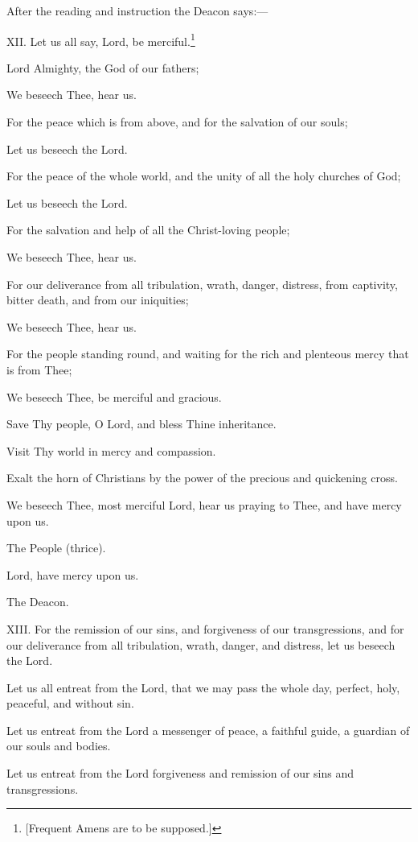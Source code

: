 After the reading and instruction the Deacon says:—

XII. Let us all say, Lord, be merciful.\footnote{\par{}  [Frequent Amens are to be supposed.]}

Lord Almighty, the God of our fathers;

We beseech Thee, hear us.

For the peace which is from above, and for the salvation of our souls;

Let us beseech the Lord.

For the peace of the whole world, and the unity of all the holy churches of God;

Let us beseech the Lord.

For the salvation and help of all the Christ-loving people;

We beseech Thee, hear us.

For our deliverance from all tribulation, wrath, danger, distress, from captivity, bitter death, and from our iniquities;

We beseech Thee, hear us.

For the people standing round, and waiting for the rich and plenteous mercy that is from Thee;

We beseech Thee, be merciful and gracious.

Save Thy people, O Lord, and bless Thine inheritance.

Visit Thy world in mercy and compassion.

Exalt the horn of Christians by the power of the precious and quickening cross.

We beseech Thee, most merciful Lord, hear us praying to Thee, and have mercy upon us.

The People (thrice).

Lord, have mercy upon us.

The Deacon.

XIII. For the remission of our sins, and forgiveness of our transgressions, and for our deliverance from all tribulation, wrath, danger, and distress, let us beseech the Lord.

Let us all entreat from the Lord, that we may pass the whole day, perfect, holy, peaceful, and without sin.

Let us entreat from the Lord a messenger of peace, a faithful guide, a guardian of our souls and bodies.

Let us entreat from the Lord forgiveness and remission of our sins and transgressions.

